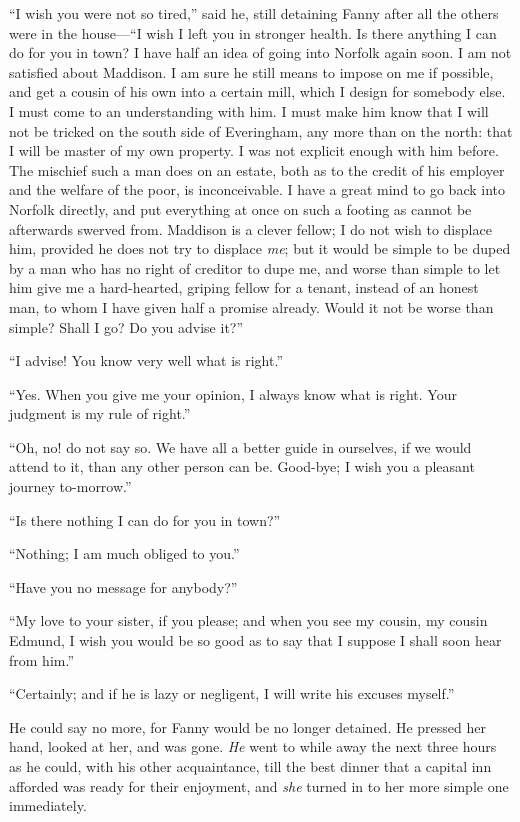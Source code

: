 \documentclass{article}
\begin{document}
``I wish you were not so tired,'' said he, still detaining
Fanny after all the others were in the house---``I wish I
left you in stronger health.  Is there anything I can
do for you in town?  I have half an idea of going into
Norfolk again soon.  I am not satisfied about Maddison.
I am sure he still means to impose on me if possible,
and get a cousin of his own into a certain mill, which I
design for somebody else.  I must come to an understanding
with him.  I must make him know that I will not be
tricked on the south side of Everingham, any more than on
the north:  that I will be master of my own property.
I was not explicit enough with him before.  The mischief
such a man does on an estate, both as to the credit of his
employer and the welfare of the poor, is inconceivable.
I have a great mind to go back into Norfolk directly,
and put everything at once on such a footing as cannot
be afterwards swerved from.  Maddison is a clever fellow;
I do not wish to displace him, provided he does not try
to displace \emph{me}; but it would be simple to be duped
by a man who has no right of creditor to dupe me,
and worse than simple to let him give me a hard-hearted,
griping fellow for a tenant, instead of an honest man,
to whom I have given half a promise already.  Would it not
be worse than simple?  Shall I go?  Do you advise it?''

``I advise!  You know very well what is right.''

``Yes.  When you give me your opinion, I always know
what is right.  Your judgment is my rule of right.''

``Oh, no! do not say so.  We have all a better guide
in ourselves, if we would attend to it, than any other person
can be.  Good-bye; I wish you a pleasant journey to-morrow.''

``Is there nothing I can do for you in town?''

``Nothing; I am much obliged to you.''

``Have you no message for anybody?''

``My love to your sister, if you please; and when you see
my cousin, my cousin Edmund, I wish you would be so good
as to say that I suppose I shall soon hear from him.''

``Certainly; and if he is lazy or negligent, I will write
his excuses myself.''

He could say no more, for Fanny would be no longer detained.
He pressed her hand, looked at her, and was gone.
\emph{He} went to while away the next three hours as he could,
with his other acquaintance, till the best dinner that
a capital inn afforded was ready for their enjoyment,
and \emph{she} turned in to her more simple one immediately.
\end{document}
